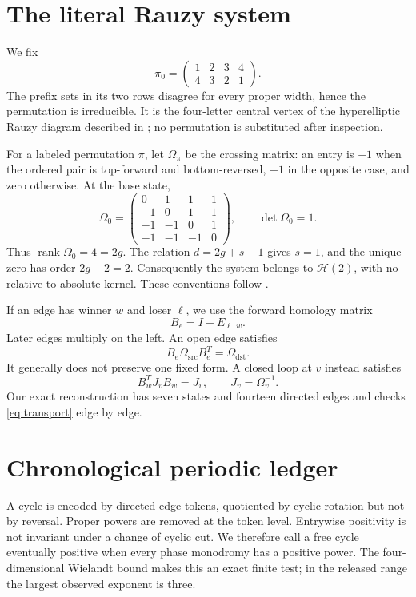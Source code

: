 \documentclass[11pt]{article}
\theoremstyle{remark}
\newcommand{\cH}{\mathcal H}
\begin{document}
\section{The literal Rauzy system}

We fix
\[
 \pi_0=\begin{pmatrix}1&2&3&4\\4&3&2&1\end{pmatrix}.
\]
The prefix sets in its two rows disagree for every proper width, hence the
permutation is irreducible.  It is the four-letter central vertex of the
hyperelliptic Rauzy diagram described in \cite{amy}; no permutation is
substituted after inspection.

For a labeled permutation $\pi$, let $\Omega_\pi$ be the crossing matrix: an
entry is $+1$ when the ordered pair is top-forward and bottom-reversed, $-1$
in the opposite case, and zero otherwise.  At the base state,
\[
\Omega_0=
\begin{pmatrix}
0&1&1&1\\-1&0&1&1\\-1&-1&0&1\\-1&-1&-1&0
\end{pmatrix},
\qquad \det\Omega_0=1.
\]
Thus $\operatorname{rank}\Omega_0=4=2g$.  The relation
$d=2g+s-1$ gives $s=1$, and the unique zero has order $2g-2=2$.
Consequently the system belongs to $\cH(2)$, with no relative-to-absolute
kernel.  These conventions follow \cite{yoccoz,zorich}.

If an edge has winner $w$ and loser $\ell$, we use the forward homology matrix
\begin{equation}\label{eq:edge}
 B_e=I+E_{\ell,w}.
\end{equation}
Later edges multiply on the left.  An open edge satisfies
\begin{equation}\label{eq:transport}
 B_e\Omega_{\mathrm{src}}B_e^T=\Omega_{\mathrm{dst}}.
\end{equation}
It generally does not preserve one fixed form.  A closed loop at $v$ instead
satisfies
\[
 B_w^T J_v B_w=J_v,\qquad J_v=\Omega_v^{-1}.
\]
Our exact reconstruction has seven states and fourteen directed edges and
checks \eqref{eq:transport} edge by edge.

\section{Chronological periodic ledger}

A cycle is encoded by directed edge tokens, quotiented by cyclic rotation but
not by reversal.  Proper powers are removed at the token level.  Entrywise
positivity is not invariant under a change of cyclic cut.  We therefore call
a free cycle eventually positive when every phase monodromy has a positive power.
The four-dimensional Wielandt bound makes this an exact finite test; in the
released range the largest observed exponent is three.
\end{document}
